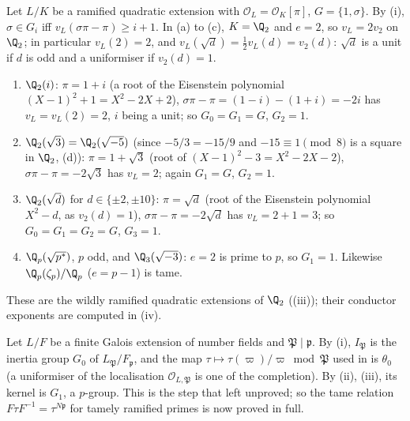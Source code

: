 \begin{example}\label{ex:local:ramgroups}
Let $L/K$ be a ramified quadratic extension with $\mathcal O_L=\mathcal O_K[\pi]$, $G=\{1,\sigma\}$. By (i), $\sigma\in G_i$ iff
$v_L(\sigma\pi-\pi)\ge i+1$. In (a) to (c), $K=\Q_2$ and $e=2$, so $v_L=2v_2$ on $\Q_2$; in particular $v_L(2)=2$, and
$v_L(\sqrt d)=\frac12v_L(d)=v_2(d)$: $\sqrt d$ is a unit if $d$ is odd and a uniformiser if $v_2(d)=1$.
\begin{enumerate}[label=(\alph*)]
\item $\Q_2(i)$: $\pi=1+i$ (a root of the Eisenstein polynomial $(X-1)^2+1=X^2-2X+2$), $\sigma\pi-\pi=(1-i)-(1+i)=-2i$ has $v_L=v_L(2)=2$, $i$ being a unit; so $G_0=G_1=G$, $G_2=1$.
\item $\Q_2(\sqrt3)=\Q_2(\sqrt{-5})$ (since $-5/3=-15/9$ and $-15\equiv1\pmod8$ is a square in $\Q_2$, (d)): $\pi=1+\sqrt3$ (root of
$(X-1)^2-3=X^2-2X-2$), $\sigma\pi-\pi=-2\sqrt3$ has $v_L=2$; again $G_1=G$, $G_2=1$.
\item $\Q_2(\sqrt d)$ for $d\in\{\pm2,\pm10\}$: $\pi=\sqrt d$ (root of the Eisenstein polynomial $X^2-d$, as $v_2(d)=1$), $\sigma\pi-\pi=-2\sqrt d$ has $v_L=2+1=3$; so $G_0=G_1=G_2=G$, $G_3=1$.
\item $\Q_p(\sqrt{p^*})$, $p$ odd, and $\Q_3(\sqrt{-3})$: $e=2$ is prime to $p$, so $G_1=1$. Likewise $\Q_p(\zeta_p)/\Q_p$ ($e=p-1$) is tame.
\end{enumerate}
These are the wildly ramified quadratic extensions of $\Q_2$ ((iii)); their conductor exponents are computed in
(iv).
\end{example}

\begin{remark}\label{rem:local:ant-tame}
Let $L/F$ be a finite Galois extension of number fields and $\mathfrak P\mid\mathfrak p$. By (i), $I_{\mathfrak P}$ is the inertia
group $G_0$ of $L_{\mathfrak P}/F_{\mathfrak p}$, and the map $\tau\mapsto\tau(\varpi)/\varpi\bmod\mathfrak P$ used in  is $\theta_0$ (a uniformiser of the
localisation $\mathcal O_{L,\mathfrak P}$ is one of the completion). By (ii), (iii), its kernel is $G_1$, a $p$-group. This is the step
that  left unproved; so the tame relation $F\tau F^{-1}=\tau^{N\mathfrak p}$ for tamely ramified primes is now proved in full.
\end{remark}

